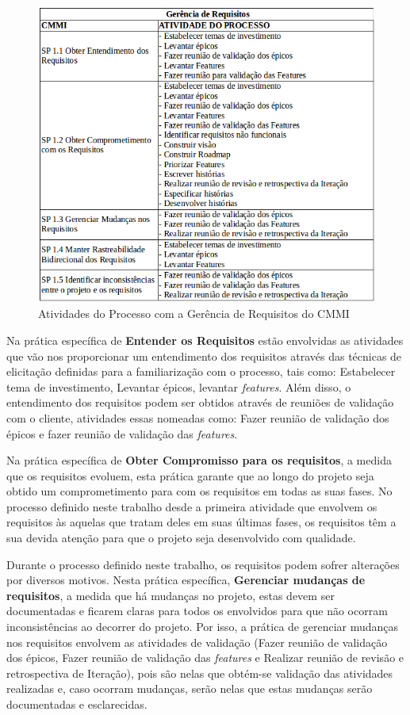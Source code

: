 \begin{figure}[!htb]
\centering
\includegraphics[scale=0.6]{figuras/gerencia.png}
\caption{Atividades do Processo com a Gerência de Requisitos do CMMI}
\label{fig:gerencia}
\end{figure}


Na prática específica de \textbf{Entender os Requisitos} estão envolvidas as atividades que vão nos proporcionar um entendimento dos requisitos através das técnicas de elicitação definidas para a familiarização com o processo, tais como: Estabelecer tema de investimento, Levantar épicos, levantar \textit{features}. Além disso, o entendimento dos requisitos podem ser obtidos através de reuniões de validação com o cliente, atividades essas nomeadas como: Fazer reunião de validação dos épicos e fazer reunião de validação das \textit{features}.

Na prática específica de \textbf{Obter Compromisso para os requisitos}, a medida que os requisitos evoluem, esta prática garante que ao longo do projeto seja obtido um comprometimento para com os requisitos em todas as suas fases. No processo definido neste trabalho desde a primeira atividade que envolvem os requisitos às aquelas que tratam deles em suas últimas fases, os requisitos têm a sua devida atenção para que o projeto seja desenvolvido com qualidade. 

Durante o processo definido neste trabalho, os requisitos podem sofrer alterações por diversos motivos. Nesta prática específica, \textbf{Gerenciar mudanças de requisitos}, a medida que há mudanças no projeto, estas devem ser documentadas e ficarem claras para todos os envolvidos para que não ocorram inconsistências ao decorrer do projeto. Por isso, a prática de gerenciar mudanças nos requisitos envolvem as atividades de validação (Fazer reunião de validação dos épicos, Fazer reunião de validação das \textit{features} e Realizar reunião de revisão e retrospectiva de Iteração), pois são nelas que obtém-se validação das atividades realizadas e, caso ocorram mudanças, serão nelas que estas mudanças serão documentadas e esclarecidas. 

